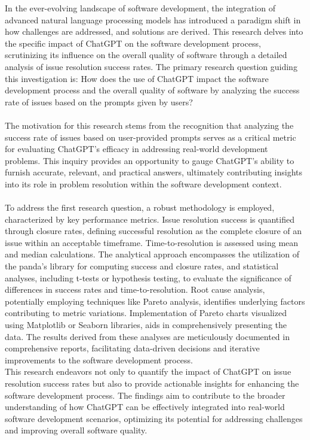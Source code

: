 \documentclass[journal]{IEEEtran}
\begin{document}
In the ever-evolving landscape of software development, the integration of advanced natural language processing models has introduced a paradigm shift in how challenges are addressed, and solutions are derived. This research delves into the specific impact of ChatGPT on the software development process, scrutinizing its influence on the overall quality of software through a detailed analysis of issue resolution success rates. The primary research question guiding this investigation is: How does the use of ChatGPT impact the software development process and the overall quality of software by analyzing the success rate of issues based on the prompts given by users? \\
\\
The motivation for this research stems from the recognition that analyzing the success rate of issues based on user-provided prompts serves as a critical metric for evaluating ChatGPT's efficacy in addressing real-world development problems. This inquiry provides an opportunity to gauge ChatGPT's ability to furnish accurate, relevant, and practical answers, ultimately contributing insights into its role in problem resolution within the software development context. \\
\\
To address the first research question, a robust methodology is employed, characterized by key performance metrics. Issue resolution success is quantified through closure rates, defining successful resolution as the complete closure of an issue within an acceptable timeframe. Time-to-resolution is assessed using mean and median calculations. The analytical approach encompasses the utilization of the panda’s library for computing success and closure rates, and statistical analyses, including t-tests or hypothesis testing, to evaluate the significance of differences in success rates and time-to-resolution. Root cause analysis, potentially employing techniques like Pareto analysis, identifies underlying factors contributing to metric variations. Implementation of Pareto charts visualized using Matplotlib or Seaborn libraries, aids in comprehensively presenting the data. The results derived from these analyses are meticulously documented in comprehensive reports, facilitating data-driven decisions and iterative improvements to the software development process. \\ 

This research endeavors not only to quantify the impact of ChatGPT on issue resolution success rates but also to provide actionable insights for enhancing the software development process. The findings aim to contribute to the broader understanding of how ChatGPT can be effectively integrated into real-world software development scenarios, optimizing its potential for addressing challenges and improving overall software quality.
\end{document}
